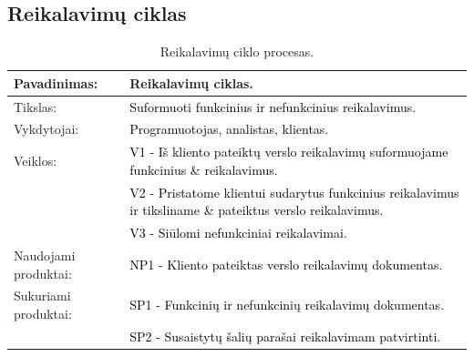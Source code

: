 \documentclass{VUMIFPSkursinis}
\begin{document}
	\subsection{Reikalavimų ciklas}
	\begin{center}
		\begin{table}[ht]
			\caption{Reikalavimų ciklo procesas.}
			\begin{tabular}{ | l | l | }
				\hline
				Pavadinimas:          & Reikalavimų ciklas.                                                                                                            \\ \hline
				Tikslas:              & \textcolor{black}{Suformuoti funkcinius ir nefunkcinius reikalavimus.}                                                         \\ \hline
				Vykdytojai:           & \textcolor{black}{Programuotojas, analistas, klientas.}                                                                        \\ \hline
				Veiklos:              & \textcolor{black}{V1 - Iš kliento pateiktų verslo reikalavimų suformuojame funkcinius \& reikalavimus.}                       \\
				                      & \textcolor{black}{V2 - Pristatome klientui sudarytus funkcinius reikalavimus ir tiksliname \& pateiktus verslo reikalavimus.} \\
				                      & \textcolor{black}{V3 - Siūlomi nefunkciniai reikalavimai.}                                                                     \\ \hline
				Naudojami produktai:  & \textcolor{black}{NP1 - Kliento pateiktas verslo reikalavimų dokumentas.}                                                      \\ \hline
				Sukuriami produktai:  & \textcolor{black}{SP1 - Funkcinių ir nefunkcinių reikalavimų dokumentas.}                                                      \\ \hline
				                      & \textcolor{black}{SP2 - Susaistytų šalių parašai reikalavimam patvirtinti.}                                                    \\ \hline
			\end{tabular}
		\end{table}
	\end{center}
\end{document}
